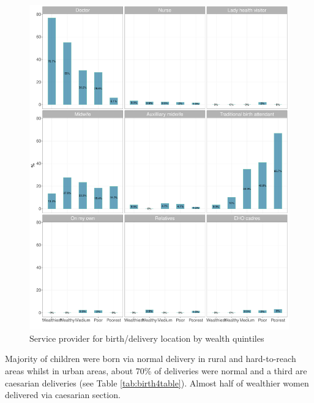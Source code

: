 \documentclass[12pt,a4paper]{article}
\begin{document}
\begin{figure}[H]

{\centering \includegraphics{kayinReport_files/figure-latex/birth6Plot-1} 

}

\caption{Service provider for birth/delivery location by wealth quintiles}\label{fig:birth6Plot}
\end{figure}

Majority of children were born via normal delivery in rural and hard-to-reach areas whilst in urban areas, about 70\% of deliveries were normal and a third are caesarian deliveries (see Table \ref{tab:birth4table}). Almost half of wealthier women delivered via caesarian section.
\end{document}
